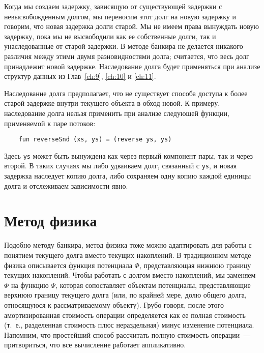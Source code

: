 Когда мы создаем задержку, зависящую от существующей задержки с
невысвобожденным долгом, мы переносим этот долг на новую задержку и
говорим, что новая задержка  долги
старой. Мы не имеем права вынуждать новую задержку, пока мы не
высвободили как ее собственные долги, так и унаследованные от старой
задержки. В методе банкира не делается никакого различия между этими
двумя разновидностями долга; считается, что весь долг принадлежит
новой задержке. Наследование долга будет применяться при анализе
структур данных из Глав~\ref{ch:9}, \ref{ch:10} и \ref{ch:11}.

\begin{remark}
  Наследование долга предполагает, что не существует способа доступа к
  более старой задержке внутри текущего объекта в обход новой. К
  примеру, наследование долга нельзя применить при анализе следующей
  функции, применяемой к паре потоков:
  \begin{lstlisting}
    fun reverseSnd (xs, ys) = (reverse ys, ys)
  \end{lstlisting}
  Здесь \lstinline!ys! может быть вынуждена как через первый компонент
  пары, так и через второй. В таких случаях мы либо удваиваем долг,
  связанный с \lstinline!ys!, и новая задержка наследует копию долга,
  либо сохраняем одну копию каждой единицы долга и отслеживаем
  зависимости явно.
\end{remark}

\section{Метод физика}
\label{sc:6.4}

Подобно методу банкира, метод физика тоже можно адаптировать для работы
с понятием текущего долга вместо текущих накоплений.  В традиционном
методе физика описывается функция потенциала $\Phi$, представляющая
нижнюю границу текущих накоплений. Чтобы работать с долгом вместо
накоплений, мы заменяем $\Phi$ на функцию $\Psi$, которая сопоставляет
объектам потенциалы, представляющие верхнюю границу текущего долга
(или, по крайней мере, долю общего долга, относящуюся к
рассматриваемому объекту).  Грубо говоря, после этого амортизированная
стоимость операции определяется как ее полная стоимость (т.~е.,
разделенная стоимость плюс нераздельная) минус изменение
потенциала. Напомним, что простейший способ рассчитать полную
стоимость операции~--- притвориться, что все вычисление работает
аппликативно. 

